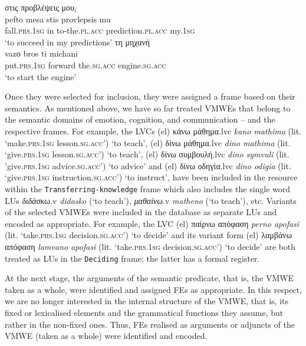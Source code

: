 \documentclass[output=paper,colorlinks,citecolor=brown]{langscibook}
\begin{document}
\ea
\label{ex:pefto-mesa.vpc}
\glll
{}  στις προβλέψεις μου$_i$\\
pefto 		mesa stis provlepsis mu\\
fall.\textsc{prs.1sg} in
to-the.\textsc{pl.acc} 
prediction.\textsc{pl.acc} 
my.\textsc{1sg}\\
\glt ‘to succeed in my predictions’
\ex
\label{ex:vazo-bros}
\glll
{}  {τη} {μηχανή}\\
{vazο} {bros} {ti} {michani}\\
{put.\textsc{prs.1sg}} {forward} {the.\textsc{sg.acc}} {engine.\textsc{sg.acc}} \\
\glt ‘to start the engine’
\z

Once they were selected for inclusion, they were assigned a frame based on their semantics. As mentioned above, we have so far treated VMWEs that belong to the semantic domains of emotion, cognition, and communication -- and the respective frames. For example, the LVCs  (el) {{κάνω μάθημα}}.lvc \textit{kano mathima} (lit. `make.\textsc{prs.1sg} lesson.\textsc{sg.acc}') `to teach', (el) {{δίνω μάθημα}}.lvc \textit{dino mathima} (lit. `give.\textsc{prs.1sg} lesson.\textsc{sg.acc}') `to teach', (el) {{δίνω συμβουλή}}.lvc \textit{dino symvuli} (lit. 'give.\textsc{prs.1sg} advice.\textsc{sg.acc}') `to advice' and (el) {{δίνω οδηγία}}.lvc \textit{dino odigia} (lit. `give.\textsc{prs.1sg} instruction.\textsc{sg.acc}') `to instruct', have been included in the resource within the \texttt{Transferring-knowledge} frame which also includes the single word LUs \textit{διδάσκω}.v \textit{didasko} (`to teach'), \textit{μαθαίνω}.v \textit{matheno} (`to teach'), etc. Variants of the selected VMWEs were included in the database as separate LUs and encoded as appropriate. For example, the LVC (el) {{παίρνω}} {{απόφαση}} \textit{perno apofasi} (lit. `take.\textsc{prs.1sg} decision.\textsc{sg.acc}') `to decide' and its variant form (el) {{λαμβάνω}} {{απόφαση}} \textit{lamvano apofasi} (lit. `take.\textsc{prs.1sg} decision.\textsc{sg.acc}') `to decide' are both treated as LUs in the \texttt{Deciding} frame; the latter has a formal register.

At the next stage, the arguments of the semantic predicate, that is, the VMWE taken as a whole, were identified and assigned FEs as appropriate. In this respect, we are no longer interested in the internal structure of the VMWE, that is, its fixed or lexicalised elements and the grammatical functions they assume, but rather in the non-fixed ones. Thus, FEs realised as arguments or adjuncts of the VMWE (taken as a whole) were identified and encoded.
\end{document}

